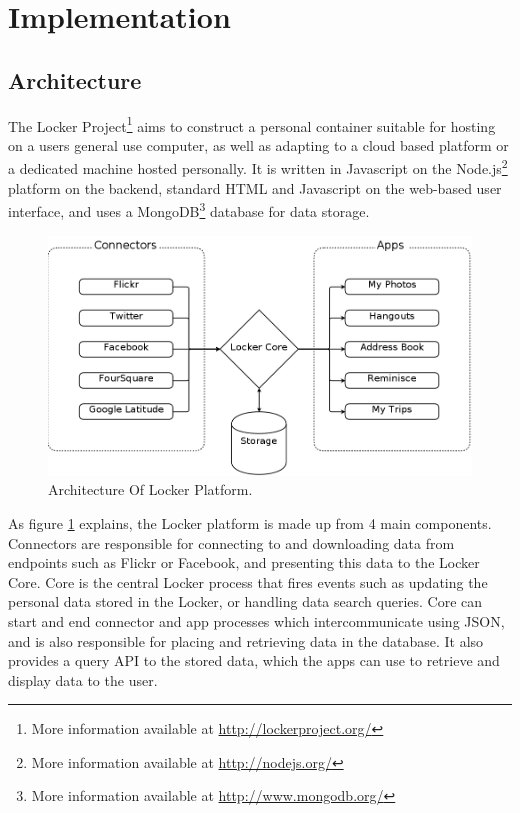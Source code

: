 \documentclass[11pt,a4paper,twoside]{article}
\begin{document}
\newpage
\section{Implementation}

\subsection{Architecture}
The Locker Project\footnote{More information available at \url{http://lockerproject.org/}} aims to construct a personal container suitable for hosting on a users general use computer, as well as adapting to a cloud based platform or a dedicated machine hosted personally. It is written in Javascript on the Node.js\footnote{More information available at \url{http://nodejs.org/}} platform on the backend, standard HTML and Javascript on the web-based user interface, and uses a MongoDB\footnote{More information available at \url{http://www.mongodb.org/}} database for data storage.

\begin{figure}[h]
  \begin{center}
    \includegraphics[scale=0.4]{LockerDia.png}
  \end{center}
  \caption{Architecture Of Locker Platform.}
  \label{img-lockerDia}
\end{figure}

As figure \ref{img-lockerDia} explains, the Locker platform is made up from 4 main components. Connectors are responsible for connecting to and downloading data from endpoints such as Flickr or Facebook, and presenting this data to the Locker Core. Core is the central Locker process that fires events such as updating the personal data stored in the Locker, or handling data search queries. Core can start and end connector and app processes which intercommunicate using JSON, and is also responsible for placing and retrieving data in the database. It also provides a query API to the stored data, which the apps can use to retrieve and display data to the user.
\end{document}
